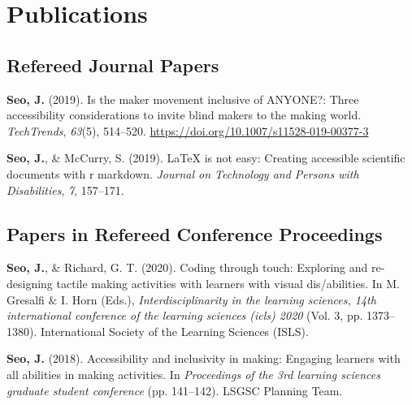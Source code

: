 \documentclass[11pt, a4paper]{awesome-cv}
\begin{document}
\hypertarget{publications}{%
\section{Publications}\label{publications}}

\hypertarget{refereed-journal-papers}{%
\subsection{Refereed Journal Papers}\label{refereed-journal-papers}}

\begingroup
\setlength{\parindent}{-0.5in}
\setlength{\leftskip}{0.5in}

\hypertarget{refs_journals}{}
\leavevmode\hypertarget{ref-seo2019maker}{}%
\textbf{Seo, J.} (2019). Is the maker movement inclusive of ANYONE?:
Three accessibility considerations to invite blind makers to the making
world. \emph{TechTrends}, \emph{63}(5), 514--520.
\url{https://doi.org/10.1007/s11528-019-00377-3}

\leavevmode\hypertarget{ref-seo2019arow}{}%
\textbf{Seo, J.}, \& McCurry, S. (2019). LaTeX is not easy: Creating
accessible scientific documents with r markdown. \emph{Journal on
Technology and Persons with Disabilities}, \emph{7}, 157--171.

\endgroup

\hypertarget{papers-in-refereed-conference-proceedings}{%
\subsection{Papers in Refereed Conference
Proceedings}\label{papers-in-refereed-conference-proceedings}}

\begingroup
\setlength{\parindent}{-0.5in}
\setlength{\leftskip}{0.5in}

\hypertarget{refs_proceedings}{}
\leavevmode\hypertarget{ref-seo2020coding}{}%
\textbf{Seo, J.}, \& Richard, G. T. (2020). Coding through touch:
Exploring and re-designing tactile making activities with learners with
visual dis/abilities. In M. Gresalfi \& I. Horn (Eds.),
\emph{Interdisciplinarity in the learning sciences, 14th international
conference of the learning sciences (icls) 2020} (Vol. 3, pp.
1373--1380). International Society of the Learning Sciences (ISLS).

\leavevmode\hypertarget{ref-seo2018making}{}%
\textbf{Seo, J.} (2018). Accessibility and inclusivity in making:
Engaging learners with all abilities in making activities. In
\emph{Proceedings of the 3rd learning sciences graduate student
conference} (pp. 141--142). LSGSC Planning Team.
\end{document}
